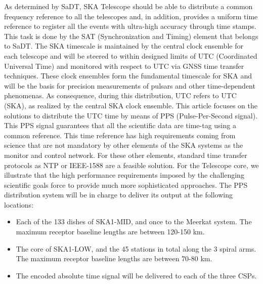 As determined by SaDT, SKA Telescope should be able to distribute a common frequency reference to all the telescopes and, in addition, provides a uniform time reference to register all the events with ultra-high accuracy through time stamps. This task is done by the SAT (Synchronization and Timing) element that belongs to SaDT. The SKA timescale is maintained by the central clock ensemble for each telescope and will be steered to within designed limits of UTC (Coordinated Universal Time) and monitored with respect to UTC via GNSS time transfer techniques. These clock ensembles form the fundamental timescale for SKA and will be the basis for precision measurements of pulsars and other time-dependent phenomenas. As consequence, during this distribution, UTC refers to UTC (SKA), as realized by the central SKA clock ensemble.
This article focuses on the solutions to distribute the UTC time by means of PPS (Pulse-Per-Second signal). This PPS signal guarantees that all the scientific data are time-tag using a common reference. This time reference has high requirements coming from science that are not mandatory by other elements of the SKA systems as the monitor and control network. For these other elements, standard time transfer protocols as NTP or IEEE-1588 are a feasible solution. For the Telescope core, we illustrate that the high performance requirements imposed by the challenging scientific goals force to provide much more sophisticated approaches. 
The PPS distribution system will be in charge to deliver its output at the following locations:

\begin{itemize}
	\item {Each of the 133 dishes of SKA1-MID, and once to the Meerkat system. The maximum receptor baseline lengths are between 120-150 km.}
	\item {The core of SKA1-LOW, and the 45 stations in total along the 3 spiral arms. The maximum receptor baseline lengths are between 70-80 km. }
	\item {The encoded absolute time signal will be delivered to each of the three CSPs.}
\end{itemize}
 

